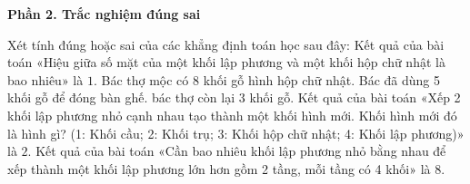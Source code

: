\textbf{Phần 2. Trắc nghiệm đúng sai}

\begin{ex} %
Xét tính đúng hoặc sai của các khẳng định toán học sau đây:
\choiceTF
{Kết quả của bài toán «Hiệu giữa số mặt của một khối lập phương và một khối hộp chữ nhật là bao nhiêu» là $1$.}
{\True Bác thợ mộc có 8 khối gỗ hình hộp chữ nhật. Bác đã dùng 5 khối gỗ để đóng bàn ghế. bác thợ còn lại $3$ khối gỗ.}
{Kết quả của bài toán «Xếp 2 khối lập phương nhỏ cạnh nhau tạo thành một khối hình mới. Khối hình mới đó là hình gì? (1: Khối cầu; 2: Khối trụ; 3: Khối hộp chữ nhật; 4: Khối lập phương)» là $2$.}
{\True Kết quả của bài toán «Cần bao nhiêu khối lập phương nhỏ bằng nhau để xếp thành một khối lập phương lớn hơn gồm 2 tầng, mỗi tầng có 4 khối» là $8$.}
\end{ex}

